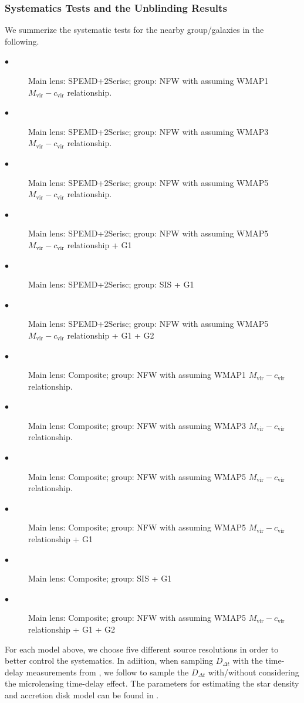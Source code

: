 \documentclass[useAMS,usenatbib]{mnras}
\newcommand{\Ddt}{D_{\Delta t}}
\begin{document}
\subsubsection{Systematics Tests and the Unblinding Results}
\label{subsubsec:pg_system}
We summerize the systematic tests for the nearby group/galaxies in the following. 
\begin{description}
  \item[$\bullet$] Main lens: SPEMD+2Serisc; group: NFW with assuming WMAP1 $M_{\textrm{vir}}-c_{\textrm{vir}}$ relationship.
  \item[$\bullet$] Main lens: SPEMD+2Serisc; group: NFW with assuming WMAP3 $M_{\textrm{vir}}-c_{\textrm{vir}}$ relationship.
  \item[$\bullet$] Main lens: SPEMD+2Serisc; group: NFW with assuming WMAP5 $M_{\textrm{vir}}-c_{\textrm{vir}}$ relationship.
  \item[$\bullet$] Main lens: SPEMD+2Serisc; group: NFW with assuming WMAP5 $M_{\textrm{vir}}-c_{\textrm{vir}}$ relationship + G1
  \item[$\bullet$] Main lens: SPEMD+2Serisc; group: SIS + G1
  \item[$\bullet$] Main lens: SPEMD+2Serisc; group: NFW with assuming WMAP5 $M_{\textrm{vir}}-c_{\textrm{vir}}$ relationship + G1 + G2
  \item[$\bullet$] Main lens: Composite; group: NFW with assuming WMAP1 $M_{\textrm{vir}}-c_{\textrm{vir}}$ relationship.
  \item[$\bullet$] Main lens: Composite; group: NFW with assuming WMAP3 $M_{\textrm{vir}}-c_{\textrm{vir}}$ relationship.
  \item[$\bullet$] Main lens: Composite; group: NFW with assuming WMAP5 $M_{\textrm{vir}}-c_{\textrm{vir}}$ relationship.
  \item[$\bullet$] Main lens: Composite; group: NFW with assuming WMAP5 $M_{\textrm{vir}}-c_{\textrm{vir}}$ relationship + G1
  \item[$\bullet$] Main lens: Composite; group: SIS + G1
  \item[$\bullet$] Main lens: Composite; group: NFW with assuming WMAP5 $M_{\textrm{vir}}-c_{\textrm{vir}}$ relationship + G1 + G2
\end{description}
For each model above, we choose five different source resolutions in order to better control the systematics. In adiition, when sampling $\Ddt$ with the time-delay measurements from \citet{BonvinEtal18}, we follow \citet{GChenEtal18a} to sample the $\Ddt$ with/without considering the microlensing time-delay effect. The parameters for estimating the star density and accretion disk model can be found in \citet{GChenEtal18a}. 
\end{document}
